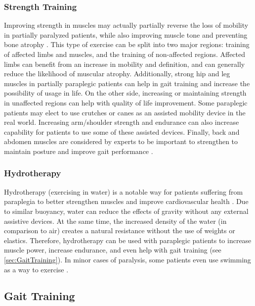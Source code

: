 \subsubsection{Strength Training}
Improving strength in muscles may actually partially reverse the loss of mobility in partially paralyzed patients, while also improving muscle tone \cite{AerobicCapacityParaplegia} and preventing bone atrophy \cite{ParalysisStretchingWeightLoadingPMID}. This type of exercise can be split into two major regions: training of affected limbs and muscles, and the training of non-affected regions. Affected limbs can benefit from an increase in mobility and definition, and can generally reduce the likelihood of muscular atrophy. Additionally, strong hip and leg muscles in partially paraplegic patients can help in gait training and increase the possibility of usage in life. On the other side, increasing or maintaining strength in unaffected regions can help with quality of life improvement. Some paraplegic patients may elect to use crutches or canes as an assisted mobility device in the real world. Increasing arm/shoulder strength and endurance can also increase capability for patients to use some of these assisted devices. Finally, back and abdomen muscles are considered by experts to be important to strengthen to maintain posture and improve gait performance \cite{TrunkMuscleLoadingParaplegia}. 

\subsubsection{Hydrotherapy}
Hydrotherapy (exercising in water) is a notable way for patients suffering from paraplegia to better strengthen muscles and improve cardiovascular health \cite{RehabParaplegia}. Due to similar buoyancy, water can reduce the effects of gravity without any external assistive devices. At the same time, the increased density of the water (in comparison to air) creates a natural resistance without the use of weights or elastics. Therefore, hydrotherapy can be used with paraplegic patients to increase muscle power, increase endurance, and even help with gait training (see \autoref{sec:GaitTraining}). In minor cases of paralysis, some patients even use swimming as a way to exercise \cite{BenefitsOfHydrotherapy}.

\subsection{Gait Training}
\label{sec:GaitTraining}

